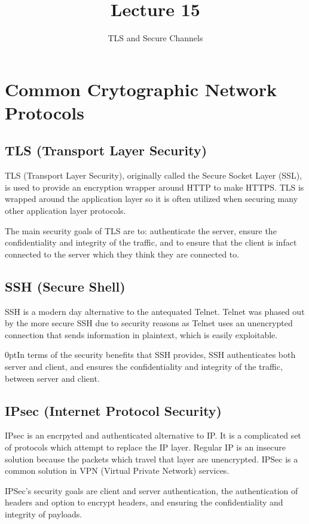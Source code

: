 \documentclass[11pt]{article} %
\title{Lecture 15}
\author{TLS and Secure Channels}
\begin{document}
\maketitle

\section{Common Crytographic Network Protocols}

\subsection{TLS (Transport Layer Security)}
TLS (Transport Layer Security), originally called the Secure Socket Layer (SSL),
is used to provide an encryption wrapper around HTTP to make HTTPS.  TLS is 
wrapped around the application layer so it is often utilized when securing many
other application layer protocols.  

\bigskip
{\parindent0pt The main security goals of TLS are to: authenticate the server,
ensure the confidentiality and integrity of the traffic, and to ensure that the
client is infact connected to the server which they think they are connected to.}

\subsection{SSH (Secure Shell)}
SSH is a modern day alternative to the antequated Telnet.  Telnet was phased out
by the more secure SSH due to security reasons as Telnet uses an unencrypted 
connection that sends information in plaintext, which is easily exploitable.

\bigskip
{\parindent0ptIn terms of the security benefits that SSH provides, SSH 
authenticates both server and client, and ensures the confidentiality and 
integrity of the traffic, between server and client.}

\subsection{IPsec (Internet Protocol Security)}
IPsec is an encrpyted and authenticated alternative to IP.  It is a complicated
set of protocols which attempt to replace the IP layer.  Regular IP is an
insecure solution because the packets which travel that layer are unencrypted.
IPSec is a common solution in VPN (Virtual Private Network) services.

\bigskip
{\parindent0pt IPSec's security goals are client and server authentication, the
authentication of headers and option to encrypt headers, and ensuring the
confidentiality and integrity of payloads.}
\end{document}
